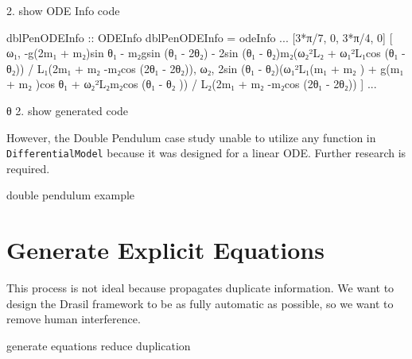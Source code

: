 2. show ODE Info code

\begin{listing}[ht]
\begin{haskell1}
dblPenODEInfo :: ODEInfo
dblPenODEInfo = odeInfo
  ...
  [3*π/7, 0, 3*π/4, 0]
  [ ω₁,
  -g(2m₁ + m₂)sin θ₁ - m₂gsin (θ₁ - 2θ₂) - 2sin (θ₁ - θ₂)m₂(ω₂²L₂ + ω₁²L₁cos (θ₁ - θ₂))
    /
    L₁(2m₁ + m₂ -m₂cos (2θ₁ - 2θ₂)),
  ω₂,
  2sin (θ₁ - θ₂)(ω₁²L₁(m₁ + m₂ ) + g(m₁ + m₂ )cos θ₁ + ω₂²L₂m₂cos (θ₁ - θ₂ ))
    /
    L₂(2m₁ + m₂ -m₂cos (2θ₁ - 2θ₂))
  ]
  ...
\end{haskell1}
\end{listing}
θ
2. show generated code

However, the Double Pendulum case study unable to utilize any function in \verb|DifferentialModel| because it was designed for a linear ODE. Further research is required.


double pendulum example

\section{Generate Explicit Equations}
This process is not ideal because propagates duplicate information. We want to design the Drasil framework to be as fully automatic as possible, so we want to remove human interference.

generate equations
reduce duplication
